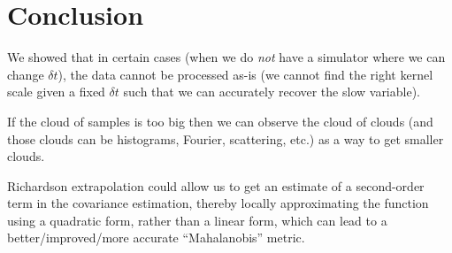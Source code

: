 \documentclass[1p]{elsarticle}
\begin{document}
\section{Conclusion}

We showed that in certain cases (when we do {\em not} have a simulator where we can change $\delta t$), the data cannot be processed as-is (we cannot find the right kernel scale given a fixed $\delta t$ such that we can accurately recover the slow variable). 

If the cloud of samples is too big then we can observe the cloud of clouds (and those clouds can be histograms, Fourier, scattering, etc.) as a way to get smaller clouds. 


Richardson extrapolation could allow us to get an estimate of a second-order term in the covariance estimation, thereby locally approximating the function using a quadratic form, rather than a linear form,  which can lead to a better/improved/more accurate ``Mahalanobis'' metric. 
\end{document}
